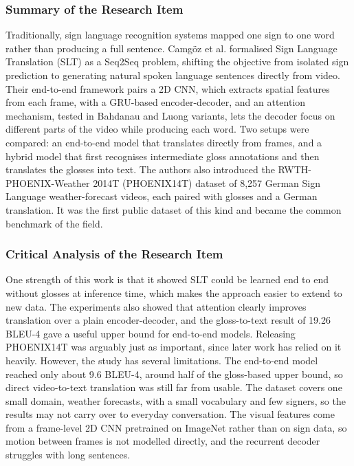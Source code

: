 \documentclass{FastFyp}
\begin{document}
\subsubsection*{Summary of the Research Item}
Traditionally, sign language recognition systems mapped one sign to one word rather than producing a full sentence. Camg\"oz et al. \cite{ref:Camgoz:2018} formalised Sign Language Translation (SLT) as a Seq2Seq problem, shifting the objective from isolated sign prediction to generating natural spoken language sentences directly from video. Their end-to-end framework pairs a 2D CNN, which extracts spatial features from each frame, with a GRU-based encoder-decoder, and an attention mechanism, tested in Bahdanau \cite{bahdanau2015attention} and Luong \cite{luong2015attention} variants, lets the decoder focus on different parts of the video while producing each word. Two setups were compared: an end-to-end model that translates directly from frames, and a hybrid model that first recognises intermediate gloss annotations and then translates the glosses into text. The authors also introduced the RWTH-PHOENIX-Weather 2014T (PHOENIX14T) dataset \cite{ref:Camgoz:2018} of 8,257 German Sign Language weather-forecast videos, each paired with glosses and a German translation. It was the first public dataset of this kind and became the common benchmark of the field.

\subsubsection*{Critical Analysis of the Research Item}
One strength of this work is that it showed SLT could be learned end to end without glosses at inference time, which makes the approach easier to extend to new data. The experiments also showed that attention clearly improves translation over a plain encoder-decoder, and the gloss-to-text result of 19.26 BLEU-4 gave a useful upper bound for end-to-end models. Releasing PHOENIX14T was arguably just as important, since later work has relied on it heavily. However, the study has several limitations. The end-to-end model reached only about 9.6 BLEU-4, around half of the gloss-based upper bound, so direct video-to-text translation was still far from usable. The dataset covers one small domain, weather forecasts, with a small vocabulary and few signers, so the results may not carry over to everyday conversation. The visual features come from a frame-level 2D CNN pretrained on ImageNet rather than on sign data, so motion between frames is not modelled directly, and the recurrent decoder struggles with long sentences.
\end{document}
